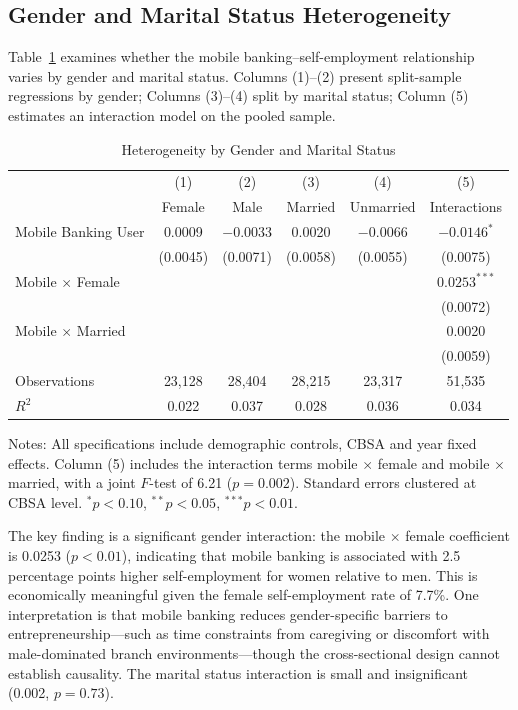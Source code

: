 \documentclass[12pt]{article}
\begin{document}
\subsection{Gender and Marital Status Heterogeneity}

Table~\ref{tab:het_gender} examines whether the mobile banking--self-employment relationship varies by gender and marital status. Columns (1)--(2) present split-sample regressions by gender; Columns (3)--(4) split by marital status; Column (5) estimates an interaction model on the pooled sample.

\begin{table}[H]
\centering
\caption{Heterogeneity by Gender and Marital Status}
\label{tab:het_gender}
\begin{threeparttable}
\begin{tabular}{lccccc}
\toprule
& (1) & (2) & (3) & (4) & (5) \\
& Female & Male & Married & Unmarried & Interactions \\
\midrule
Mobile Banking User & 0.0009 & $-0.0033$ & 0.0020 & $-0.0066$ & $-0.0146^{*}$ \\
& (0.0045) & (0.0071) & (0.0058) & (0.0055) & (0.0075) \\[4pt]
Mobile $\times$ Female & & & & & $0.0253^{***}$ \\
& & & & & (0.0072) \\[4pt]
Mobile $\times$ Married & & & & & 0.0020 \\
& & & & & (0.0059) \\
\midrule
Observations & 23,128 & 28,404 & 28,215 & 23,317 & 51,535 \\
$R^2$ & 0.022 & 0.037 & 0.028 & 0.036 & 0.034 \\
\bottomrule
\end{tabular}
\begin{tablenotes}
\small
\item Notes: All specifications include demographic controls, CBSA and year fixed effects. Column (5) includes the interaction terms mobile $\times$ female and mobile $\times$ married, with a joint $F$-test of 6.21 ($p = 0.002$). Standard errors clustered at CBSA level. $^{*}p<0.10$, $^{**}p<0.05$, $^{***}p<0.01$.
\end{tablenotes}
\end{threeparttable}
\end{table}

The key finding is a significant gender interaction: the mobile $\times$ female coefficient is 0.0253 ($p < 0.01$), indicating that mobile banking is associated with 2.5 percentage points higher self-employment for women relative to men. This is economically meaningful given the female self-employment rate of 7.7\%. One interpretation is that mobile banking reduces gender-specific barriers to entrepreneurship---such as time constraints from caregiving or discomfort with male-dominated branch environments---though the cross-sectional design cannot establish causality. The marital status interaction is small and insignificant (0.002, $p = 0.73$).
\end{document}
